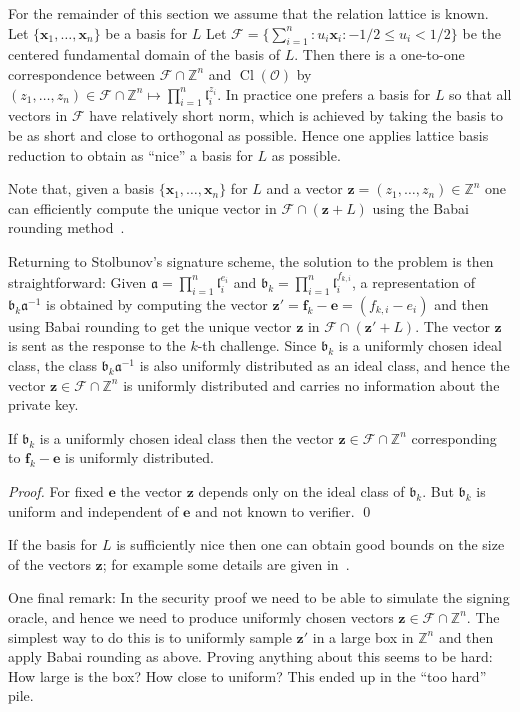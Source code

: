 \documentclass{llncs}
\newcommand{\FF}{\mathcal{F}}
\newcommand{\OO}{\mathcal{O}}
\newcommand{\Z}{\mathbb{Z}}
\DeclareMathOperator{\Cl}{Cl}
\renewcommand{\a}{\mathfrak{a}}
\renewcommand{\b}{\mathfrak{b}}
\renewcommand{\l}{\mathfrak{l}}
\newcommand{\e}{\mathbf{e}}
\newcommand{\f}{\mathbf{f}}
\newcommand{\x}{\mathbf{x}}
\newcommand{\z}{\mathbf{z}}
\begin{document}
For the remainder of this section we assume that the relation lattice is known.
Let $\{ \x_1, \dots, \x_n \}$ be a basis for $L$
Let $\FF = \{ \sum_{i=1}^n : u_i \x_i : -1/2 \le u_i < 1/2 \}$ be the centered fundamental domain of the basis of $L$.
Then there is a one-to-one correspondence between $\FF \cap \Z^n$ and $\Cl(\OO)$ by
$(z_1, \dots, z_n ) \in \FF \cap \Z^n  \mapsto \prod_{i=1}^n \l_i^{z_i}$.
In practice one prefers a basis for $L$ so that all vectors in $\FF$ have relatively short norm, which is achieved by taking the basis to be as short and close to orthogonal as possible. Hence one applies lattice basis reduction to obtain as ``nice'' a basis for $L$ as possible.

Note that, given a basis $\{ \x_1, \dots, \x_n \}$ for $L$ and a vector $\z = (z_1, \dots, z_n ) \in \Z^n$ one can efficiently compute the unique vector in $\FF \cap (\z + L )$ using the Babai rounding method~\cite{Bab86}.



Returning to Stolbunov's signature scheme, the solution to the problem is then straightforward:
Given $\a = \prod_{i=1}^n \l_i^{e_i}$ and $\b_k = \prod_{i=1}^n \l_i^{f_{k,i}}$,
a representation of $\b_k \a^{-1}$ is obtained by computing the vector $\z' = \f_k - \e = (f_{k,i} - e_i)$
and then using Babai rounding to get the unique vector $\z$ in $\FF \cap (\z' + L )$.
The vector $\z$ is sent as the response to the $k$-th challenge.
Since $\b_k$ is a uniformly chosen ideal class, the class $\b_k \a^{-1}$ is also uniformly distributed as an ideal class, and hence the vector $\z \in \FF \cap \Z^n$ is uniformly distributed and carries no information about the private key.

\begin{lemma}
If $\b_k$ is a uniformly chosen ideal class then the vector 
$\z \in \FF \cap \Z^n$ corresponding to $\f_k - \e$ is uniformly distributed.
\end{lemma}

\begin{proof}
For fixed $\e$ the vector $\z$ depends only on the ideal class of $\b_k$.
But $\b_k$ is uniform and independent of $\e$ and not known to verifier. \qed
\end{proof}



If the basis for $L$ is sufficiently nice then one can obtain good bounds on the size of the vectors $\z$; for example some details are given in~\cite{BS18}.

One final remark: In the security proof we need to be able to simulate the signing oracle, and hence we need to produce uniformly chosen vectors $\z \in \FF \cap \Z^n$.
The simplest way to do this is to uniformly sample $\z'$ in a large box in $\Z^n$ and then apply Babai rounding as above.
Proving anything about this seems to be hard: How large is the box? How close to uniform?
This ended up in the ``too hard'' pile.
\end{document}

